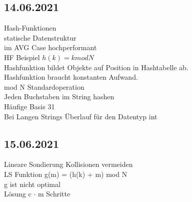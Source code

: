 \documentclass{article}
\begin{document}
 	\subsection*{14.06.2021}
 	Hash-Funktionen \\
 	statische Datenstruktur \\
 	im AVG Case hochperformant\\
 	HF Beispiel $h(k) = k mod N$ \\
 	Hashfunktion bildet Objekte auf Position in Hashtabelle ab. \\
 	Hashfunktion braucht konstanten Aufwand. \\
 	mod N Standardoperation \\
 	Jeden Buchstaben im String hashen \\
 	Häufige Basis 31 \\
 	Bei Langen Strings Überlauf für den Datentyp int \\
 	\subsection*{15.06.2021}
 	Lineare Sondierung Kollisionen vermeiden \\
 	LS Funktion g(m) = (h(k) + m) mod N \\
 	g ist nicht optimal \\
 	Lösung c  $\cdot$ m Schritte \\
\end{document}
